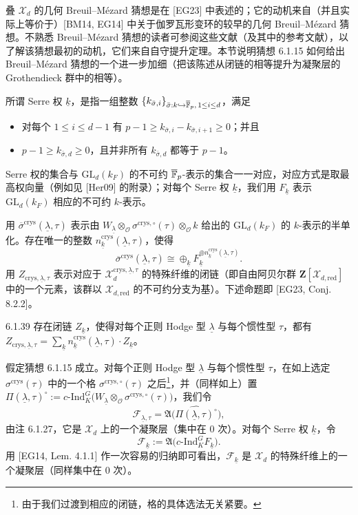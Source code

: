 叠 $\mathcal X_d$ 的几何 Breuil--Mézard 猜想是在 [EG23] 中表述的；它的动机来自（并且实际上等价于）[BM14, EG14] 中关于伽罗瓦形变环的较早的几何 Breuil--Mézard 猜想。不熟悉 Breuil--Mézard 猜想的读者可参阅这些文献（及其中的参考文献），以了解该猜想最初的动机，它们来自自守提升定理。本节说明猜想 6.1.15 如何给出 Breuil--Mézard 猜想的一个进一步加细（把该陈述从闭链的相等提升为凝聚层的 Grothendieck 群中的相等）。

所谓 Serre 权 $\underline k$，是指一组整数 $\{k_{\bar\sigma,i}\}_{\bar\sigma:k\hookrightarrow\overline{\mathbb{F}}_p,\,1\le i\le d}$，满足
\begin{itemize}
\item 对每个 $1\le i\le d-1$ 有 $p-1\ge k_{\bar\sigma,i}-k_{\bar\sigma,i+1}\ge 0$；并且
\item $p-1\ge k_{\bar\sigma,d}\ge 0$，且并非所有 $k_{\bar\sigma,d}$ 都等于 $p-1$。
\end{itemize}

Serre 权的集合与 $\mathrm{GL}_d(k_F)$ 的不可约 $\overline{\mathbb{F}}_p$-表示的集合一一对应，对应方式是取最高权向量（例如见 [Her09] 的附录）；对每个 Serre 权 $\underline k$，我们用 $F_{\underline k}$ 表示 $\mathrm{GL}_d(k_F)$ 相应的不可约 $k$-表示。

用 $\overline{\sigma}^{\mathrm{crys}}(\underline\lambda,\tau)$ 表示由 $W_{\underline\lambda}\otimes_{\mathcal O}\sigma^{\mathrm{crys},\circ}(\tau)\otimes_{\mathcal O}k$ 给出的 $\mathrm{GL}_d(k_F)$ 的 $k$-表示的半单化。存在唯一的整数 $n^{\mathrm{crys}}_{\underline k}(\underline\lambda,\tau)$，使得
\[
\overline{\sigma}^{\mathrm{crys}}(\underline\lambda,\tau)
\cong\oplus_{\underline k}F_{\underline k}^{\oplus n^{\mathrm{crys}}_{\underline k}(\underline\lambda,\tau)}.
\]
用 $Z_{\mathrm{crys},\underline\lambda,\tau}$ 表示对应于 $\mathcal X_d^{\mathrm{crys},\underline\lambda,\tau}$ 的特殊纤维的闭链（即自由阿贝尔群 $\mathbf Z[\mathcal X_{d,\mathrm{red}}]$ 中的一个元素，该群以 $\mathcal X_{d,\mathrm{red}}$ 的不可约分支为基）。下述命题即 [EG23, Conj. 8.2.2]。

\begin{conj}{6.1.39}\label{conj:a4-6-1-39}
存在闭链 $Z_{\underline k}$，使得对每个正则 Hodge 型 $\underline\lambda$ 与每个惯性型 $\tau$，都有 $Z_{\mathrm{crys},\underline\lambda,\tau}=\sum_{\underline k}n^{\mathrm{crys}}_{\underline k}(\underline\lambda,\tau)\cdot Z_{\underline k}$。
\end{conj}

假定猜想 6.1.15 成立。对每个正则 Hodge 型 $\underline\lambda$ 与每个惯性型 $\tau$，在如上选定 $\sigma^{\mathrm{crys}}(\tau)$ 中的一个格 $\sigma^{\mathrm{crys},\circ}(\tau)$ 之后\footnote{由于我们过渡到相应的闭链，格的具体选法无关紧要。}，并（同样如上）置 $\Pi(\underline\lambda,\tau)^\circ:=c\text{-}\mathrm{Ind}_K^G\bigl(W_{\underline\lambda}\otimes_{\mathcal O}\sigma^{\mathrm{crys},\circ}(\tau)\bigr)$，我们令
\[
\mathcal F_{\underline\lambda,\tau}=\mathfrak A\bigl(\widehat{\Pi(\underline\lambda,\tau)^\circ}\bigr),
\]
由注 6.1.27，它是 $\mathcal X_d$ 上的一个凝聚层（集中在 0 次）。对每个 Serre 权 $\underline k$，令
\[
\mathcal F_{\underline k}:=\mathfrak A\bigl(c\text{-}\mathrm{Ind}_K^G F_{\underline k}\bigr).
\]
用 [EG14, Lem. 4.1.1] 作一次容易的归纳即可看出，$\mathcal F_{\underline k}$ 是 $\mathcal X_d$ 的特殊纤维上的一个凝聚层（同样集中在 0 次）。

